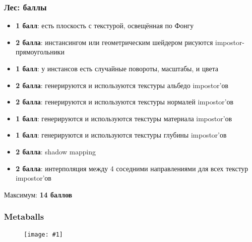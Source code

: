 \documentclass{beamer}
\newcommand{\slideimage}[1]{
  \begin{figure}
    \begin{adjustbox}{width=\textwidth, totalheight=\textheight-2\baselineskip-2\baselineskip,keepaspectratio}
      \texttt{[image: \#1]}
    \end{adjustbox}
  \end{figure}
}
\begin{document}
\begin{frame}[fragile]
\frametitle{Лес: баллы}
\fontsize{8pt}{8pt}
\selectfont
\begin{itemize}
\item \textbf{1 балл}: есть плоскость с текстурой, освещённая по Фонгу
\item \textbf{2 балла}: инстансингом или геометрическим шейдером рисуются impostor-прямоугольники
\item \textbf{1 балл}: у инстансов есть случайные повороты, масштабы, и цвета
\item \textbf{2 балла}: генерируются и используются текстуры альбедо impostor'ов
\item \textbf{2 балла}: генерируются и используются текстуры нормалей impostor'ов
\item \textbf{1 балл}: генерируются и используются текстуры материала impostor'ов
\item \textbf{1 балл}: генерируются и используются текстуры глубины impostor'ов
\item \textbf{2 балла}: shadow mapping
\item \textbf{2 балла}: интерполяция между 4 соседними направлениями для всех текстур impostor'ов
\end{itemize}
Максимум: \textbf{14 баллов}
\end{frame}

\begin{frame}
\frametitle{Metaballs}
\slideimage{metaballs.jpg}
\end{frame}
\end{document}
